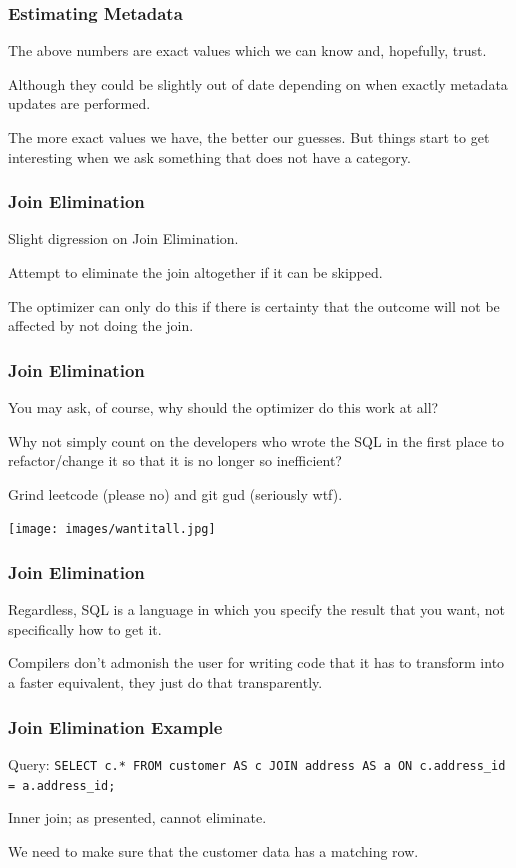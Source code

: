 \begin{frame}
\frametitle{Estimating Metadata}

The above numbers are exact values which we can know and, hopefully, trust. 

Although they could be slightly out of date depending on when exactly metadata updates are performed. 

The more exact values we have, the better our guesses. But things start to get interesting when we ask something that does not have a category.


\end{frame}


\begin{frame}
\frametitle{Join Elimination}

Slight digression on \alert{Join Elimination}.

Attempt to eliminate the join altogether if it can be skipped. 

The optimizer can only do this if there is certainty that the outcome will not be affected by not doing the join. 


\end{frame}

\begin{frame}
\frametitle{Join Elimination}

You may ask, of course, why should the optimizer do this work at all? 

Why not simply count on the developers who wrote the SQL in the first place to refactor/change it so that it is no longer so inefficient? 

Grind leetcode (please no) and git gud (seriously wtf).


\begin{center}
	\texttt{[image: images/wantitall.jpg]}
\end{center}
\end{frame}

\begin{frame}
\frametitle{Join Elimination}


Regardless, SQL is a language in which you specify the result that you want, not specifically how to get it. 


Compilers don't admonish the user for writing code that it has to transform into a faster equivalent, they just do that transparently.


\end{frame}

\begin{frame}
\frametitle{Join Elimination Example}

Query: \texttt{SELECT c.* FROM customer AS c JOIN address AS a ON c.address\_id = a.address\_id;} 


Inner join; as presented, cannot eliminate.

We need to make sure that the customer data has a matching row.


\end{frame}

